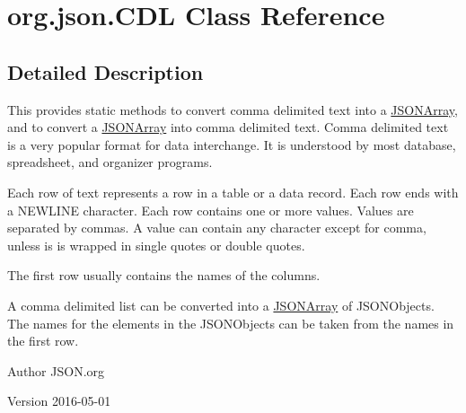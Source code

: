 \hypertarget{classorg_1_1json_1_1CDL}{\section{org.\-json.\-C\-D\-L Class Reference}
\label{classorg_1_1json_1_1CDL}
}


\subsection{Detailed Description}
This provides static methods to convert comma delimited text into a \hyperlink{classorg_1_1json_1_1JSONArray}{J\-S\-O\-N\-Array}, and to convert a \hyperlink{classorg_1_1json_1_1JSONArray}{J\-S\-O\-N\-Array} into comma delimited text. Comma delimited text is a very popular format for data interchange. It is understood by most database, spreadsheet, and organizer programs. 

Each row of text represents a row in a table or a data record. Each row ends with a N\-E\-W\-L\-I\-N\-E character. Each row contains one or more values. Values are separated by commas. A value can contain any character except for comma, unless is is wrapped in single quotes or double quotes. 

The first row usually contains the names of the columns. 

A comma delimited list can be converted into a \hyperlink{classorg_1_1json_1_1JSONArray}{J\-S\-O\-N\-Array} of J\-S\-O\-N\-Objects. The names for the elements in the J\-S\-O\-N\-Objects can be taken from the names in the first row. \begin{DoxyAuthor}{Author}
J\-S\-O\-N.\-org 
\end{DoxyAuthor}
\begin{DoxyVersion}{Version}
2016-\/05-\/01 
\end{DoxyVersion}
